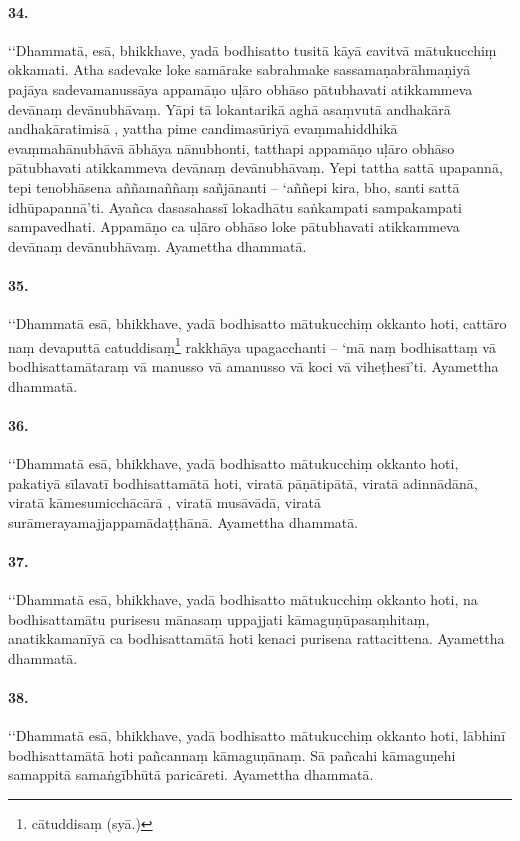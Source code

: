 \paragraph{34.} ‘‘Dhammatā, esā, bhikkhave, yadā bodhisatto tusitā kāyā cavitvā mātukucchiṃ okkamati. Atha sadevake loke samārake sabrahmake sassamaṇabrāhmaṇiyā pajāya sadevamanussāya appamāṇo uḷāro obhāso pātubhavati atikkammeva devānaṃ devānubhāvaṃ. Yāpi tā lokantarikā aghā asaṃvutā andhakārā andhakāratimisā , yattha pime candimasūriyā evaṃmahiddhikā evaṃmahānubhāvā ābhāya nānubhonti, tatthapi appamāṇo uḷāro obhāso pātubhavati atikkammeva devānaṃ devānubhāvaṃ. Yepi tattha sattā upapannā, tepi tenobhāsena aññamaññaṃ sañjānanti – ‘aññepi kira, bho, santi sattā idhūpapannā’ti. Ayañca dasasahassī lokadhātu saṅkampati sampakampati sampavedhati. Appamāṇo ca uḷāro obhāso loke pātubhavati atikkammeva devānaṃ devānubhāvaṃ. Ayamettha dhammatā.

\paragraph{35.} ‘‘Dhammatā esā, bhikkhave, yadā bodhisatto mātukucchiṃ okkanto hoti, cattāro naṃ devaputtā catuddisaṃ\footnote{cātuddisaṃ (syā.)} rakkhāya upagacchanti – ‘mā naṃ bodhisattaṃ vā bodhisattamātaraṃ vā manusso vā amanusso vā koci vā viheṭhesī’ti. Ayamettha dhammatā.

\paragraph{36.} ‘‘Dhammatā esā, bhikkhave, yadā bodhisatto mātukucchiṃ okkanto hoti, pakatiyā sīlavatī bodhisattamātā hoti, viratā pāṇātipātā, viratā adinnādānā, viratā kāmesumicchācārā , viratā musāvādā, viratā surāmerayamajjappamādaṭṭhānā. Ayamettha dhammatā.

\paragraph{37.} ‘‘Dhammatā esā, bhikkhave, yadā bodhisatto mātukucchiṃ okkanto hoti, na bodhisattamātu purisesu mānasaṃ uppajjati kāmaguṇūpasaṃhitaṃ, anatikkamanīyā ca bodhisattamātā hoti kenaci purisena rattacittena. Ayamettha dhammatā.

\paragraph{38.} ‘‘Dhammatā esā, bhikkhave, yadā bodhisatto mātukucchiṃ okkanto hoti, lābhinī bodhisattamātā hoti pañcannaṃ kāmaguṇānaṃ. Sā pañcahi kāmaguṇehi samappitā samaṅgībhūtā paricāreti. Ayamettha dhammatā.

